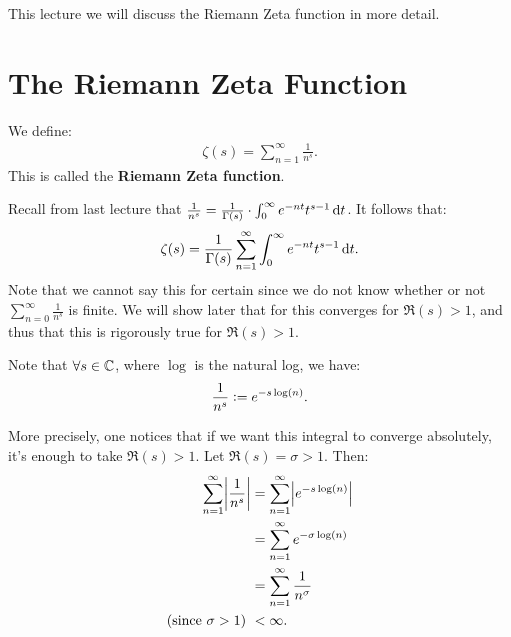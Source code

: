 \setcounter{section}{0}
\setcounter{theorem}{0}

This lecture we will discuss the Riemann Zeta function in more detail.

\section{The Riemann Zeta Function}

\begin{definition}
We define:
\begin{align*}
    \zeta(s) = \sum_{n=1}^\infty \frac{1}{n^s}.
\end{align*}
This is called the \textbf{Riemann Zeta function}.

\end{definition}

\begin{remark}\label{rem:r-sum-expression}
Recall from last lecture that $\frac{1}{n^s} = \frac{1}{\Gamma(s) } \cdot \int_0^\infty e^{-nt} t^{s-1} \dif t$. It follows that:
\begin{align*}
    \zeta(s) = \frac{1}{\Gamma(s) } \sum_{n=1}^\infty \int_0^\infty e^{-nt} t^{s-1} \dif t.
\end{align*}
Note that we cannot say this for certain since we do not know whether or not $\sum_{n=0}^\infty \frac{1}{n^s}$ is finite. We will show later that for this converges for $\Re(s) >1$, and thus that this is rigorously true for $\Re(s) >1$.
\end{remark}

 Note that $\forall s \in \mathbb{C}$, where $\log$ is the natural log, we have:
\begin{align*}
    \frac{1}{n^s} \vcentcolon = e^{- s \log(n)}.
\end{align*}

More precisely, one notices that if we want this integral to converge absolutely, it's enough to take $\Re(s) > 1$. Let $\Re(s) = \sigma > 1$. Then:
\begin{align*}
    \sum_{n=1}^\infty \abs{\frac{1}{n^s}} &= \sum_{n=1}^\infty \abs{e^{-s \log(n)}}\\
    &= \sum_{n=1}^\infty e^{- \sigma \log(n)}\\ &= \sum_{n=1}^\infty \frac{1}{n^\sigma}\\ \text{(since $\sigma > 1$) } &< \infty.
\end{align*}

